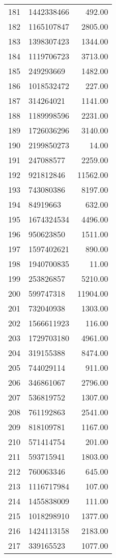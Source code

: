 \begin{table}[ht]
\begin{tabular}{rlr}
  181 & 1442338466 & 492.00 \\ 
  182 & 1165107847 & 2805.00 \\ 
  183 & 1398307423 & 1344.00 \\ 
  184 & 1119706723 & 3713.00 \\ 
  185 & 249293669 & 1482.00 \\ 
  186 & 1018532472 & 227.00 \\ 
  187 & 314264021 & 1141.00 \\ 
  188 & 1189998596 & 2231.00 \\ 
  189 & 1726036296 & 3140.00 \\ 
  190 & 2199850273 & 14.00 \\ 
  191 & 247088577 & 2259.00 \\ 
  192 & 921812846 & 11562.00 \\ 
  193 & 743080386 & 8197.00 \\ 
  194 & 84919663 & 632.00 \\ 
  195 & 1674324534 & 4496.00 \\ 
  196 & 950623850 & 1511.00 \\ 
  197 & 1597402621 & 890.00 \\ 
  198 & 1940700835 & 11.00 \\ 
  199 & 253826857 & 5210.00 \\ 
  200 & 599747318 & 11904.00 \\ 
  201 & 732040938 & 1303.00 \\ 
  202 & 1566611923 & 116.00 \\ 
  203 & 1729703180 & 4961.00 \\ 
  204 & 319155388 & 8474.00 \\ 
  205 & 744029114 & 911.00 \\ 
  206 & 346861067 & 2796.00 \\ 
  207 & 536819752 & 1307.00 \\ 
  208 & 761192863 & 2541.00 \\ 
  209 & 818109781 & 1167.00 \\ 
  210 & 571414754 & 201.00 \\ 
  211 & 593715941 & 1803.00 \\ 
  212 & 760063346 & 645.00 \\ 
  213 & 1116717984 & 107.00 \\ 
  214 & 1455838009 & 111.00 \\ 
  215 & 1018298910 & 1377.00 \\ 
  216 & 1424113158 & 2183.00 \\ 
  217 & 339165523 & 1077.00 \\ 

\end{tabular}
\end{table}

